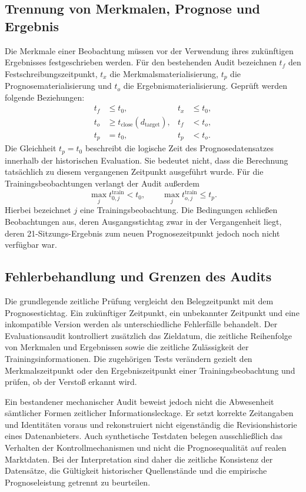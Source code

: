 \subsection{Trennung von Merkmalen, Prognose und Ergebnis}
Die Merkmale einer Beobachtung müssen vor der Verwendung ihres zukünftigen Ergebnisses festgeschrieben werden. Für den bestehenden Audit bezeichnen $t_f$ den Festschreibungszeitpunkt, $t_x$ die Merkmalsmaterialisierung, $t_p$ die Prognosematerialisierung und $t_o$ die Ergebnismaterialisierung. Geprüft werden folgende Beziehungen:
\begin{align}
 t_f &\leq t_0, & t_x &\leq t_0,\\
 t_o &\geq t_{\mathrm{close}}(d_{\mathrm{target}}), & t_f &<t_o,\\
 t_p &=t_0, & t_p &<t_o.
\end{align}
Die Gleichheit $t_p=t_0$ beschreibt die logische Zeit des Prognosedatensatzes innerhalb der historischen Evaluation. Sie bedeutet nicht, dass die Berechnung tatsächlich zu diesem vergangenen Zeitpunkt ausgeführt wurde. Für die Trainingsbeobachtungen verlangt der Audit außerdem
\begin{equation}
 \max_j t^{\mathrm{train}}_{0,j}<t_0,
 \qquad
 \max_j t^{\mathrm{train}}_{o,j}\leq t_p.
\end{equation}
Hierbei bezeichnet $j$ eine Trainingsbeobachtung. Die Bedingungen schließen Beobachtungen aus, deren Ausgangsstichtag zwar in der Vergangenheit liegt, deren 21-Sitzungs-Ergebnis zum neuen Prognosezeitpunkt jedoch noch nicht verfügbar war.

\subsection{Fehlerbehandlung und Grenzen des Audits}
Die grundlegende zeitliche Prüfung vergleicht den Belegzeitpunkt mit dem Prognosestichtag. Ein zukünftiger Zeitpunkt, ein unbekannter Zeitpunkt und eine inkompatible Version werden als unterschiedliche Fehlerfälle behandelt. Der Evaluationsaudit kontrolliert zusätzlich das Zieldatum, die zeitliche Reihenfolge von Merkmalen und Ergebnissen sowie die zeitliche Zulässigkeit der Trainingsinformationen. Die zugehörigen Tests verändern gezielt den Merkmalszeitpunkt oder den Ergebniszeitpunkt einer Trainingsbeobachtung und prüfen, ob der Verstoß erkannt wird.

Ein bestandener mechanischer Audit beweist jedoch nicht die Abwesenheit sämtlicher Formen zeitlicher Informationsleckage. Er setzt korrekte Zeitangaben und Identitäten voraus und rekonstruiert nicht eigenständig die Revisionshistorie eines Datenanbieters. Auch synthetische Testdaten belegen ausschließlich das Verhalten der Kontrollmechanismen und nicht die Prognosequalität auf realen Marktdaten. Bei der Interpretation sind daher die zeitliche Konsistenz der Datensätze, die Gültigkeit historischer Quellenstände und die empirische Prognoseleistung getrennt zu beurteilen.
